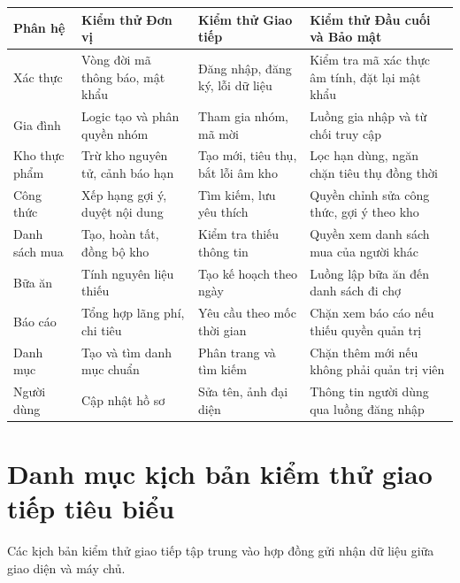 \documentclass[../main.tex]{subfiles}
\begin{document}
\begin{longtable}{|p{}|p{}|p{}|p{}|}
\hline
\textbf{Phân hệ} & \textbf{Kiểm thử Đơn vị} & \textbf{Kiểm thử Giao tiếp} & \textbf{Kiểm thử Đầu cuối và Bảo mật} \\
\hline
Xác thực & Vòng đời mã thông báo, mật khẩu & Đăng nhập, đăng ký, lỗi dữ liệu & Kiểm tra mã xác thực âm tính, đặt lại mật khẩu \\
\hline
Gia đình & Logic tạo và phân quyền nhóm & Tham gia nhóm, mã mời & Luồng gia nhập và từ chối truy cập \\
\hline
Kho thực phẩm & Trừ kho nguyên tử, cảnh báo hạn & Tạo mới, tiêu thụ, bắt lỗi âm kho & Lọc hạn dùng, ngăn chặn tiêu thụ đồng thời \\
\hline
Công thức & Xếp hạng gợi ý, duyệt nội dung & Tìm kiếm, lưu yêu thích & Quyền chỉnh sửa công thức, gợi ý theo kho \\
\hline
Danh sách mua & Tạo, hoàn tất, đồng bộ kho & Kiểm tra thiếu thông tin & Quyền xem danh sách mua của người khác \\
\hline
Bữa ăn & Tính nguyên liệu thiếu & Tạo kế hoạch theo ngày & Luồng lập bữa ăn đến danh sách đi chợ \\
\hline
Báo cáo & Tổng hợp lãng phí, chi tiêu & Yêu cầu theo mốc thời gian & Chặn xem báo cáo nếu thiếu quyền quản trị \\
\hline
Danh mục & Tạo và tìm danh mục chuẩn & Phân trang và tìm kiếm & Chặn thêm mới nếu không phải quản trị viên \\
\hline
Người dùng & Cập nhật hồ sơ & Sửa tên, ảnh đại diện & Thông tin người dùng qua luồng đăng nhập \\
\hline
\end{longtable}

\section{Danh mục kịch bản kiểm thử giao tiếp tiêu biểu}
Các kịch bản kiểm thử giao tiếp tập trung vào hợp đồng gửi nhận dữ liệu giữa giao diện và máy chủ.
\end{document}
